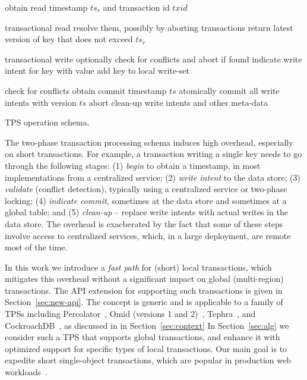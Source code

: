 \begin{algorithm}[htb]
\begin{algorithmic}
\State obtain read timestamp $ts_r$ and transaction id $txid$
\EndProcedure
\Statex

 \Comment transactional read
	\State resolve them, possibly by aborting transactions
\EndIf
\State return latest version of key that does not exceed $ts_r$
\EndProcedure
\Statex

 \Comment transactional write
\State optionally check for conflicts and abort if found 
\State indicate write intent for key with value
\State add key to local write-set
\EndProcedure
\Statex

  \Comment check for conflicts
	\State obtain commit timestamp $ts$
	\State atomically commit all write intents with version $ts$
\Else
	\State abort	
\EndIf
\State clean-up write intents and other meta-data
\EndProcedure
\end{algorithmic}
\caption{TPS operation schema.} 
\label{alg:schema}
\end{algorithm} 

The two-phase transaction processing schema induces high overhead, especially on short transactions. For example, a transaction writing a single key needs to go through the following stages:  (1) \emph{begin} to obtain a timestamp, in most implementations from a centralized service;  (2) \emph{write intent} to the data store; (3) \emph{validate} (conflict detection), typically using a centralized service or two-phase locking; (4) \emph{indicate commit}, sometimes at the data store and sometimes at a global table; and (5) \emph{clean-up} -- replace write intents with actual writes in the data store. 
The overhead is exacberated by 
the fact that some of these steps involve access to centralized services, which, in a large deployment, are remote most of the time.

In this work we introduce a \emph{fast path} for (short) local transactions, which mitigates this overhead
without a significant impact on global (multi-region) transactions. The API extension for supporting such transactions 
is given in Section~\ref{sec:new-api}. 
The concept is generic and is applicable to a family of TPSs including 
Percolator~\cite{Percolator2010}, Omid (versions 1 and 2)~\cite{OmidICDE2014,omid-blog}, Tephra~\cite{tephra}, 
and CockroachDB~\cite{cockroach}, as discussed in in Section~\ref{sec:context}
In Section~\ref{sec:alg} we consider such a TPS that supports global transactions, 
and enhance it with optimized support for specific types of local
transactions. Our main goal is to expedite short single-object transactions,
which are popular in production web workloads~\cite{sieve}.

